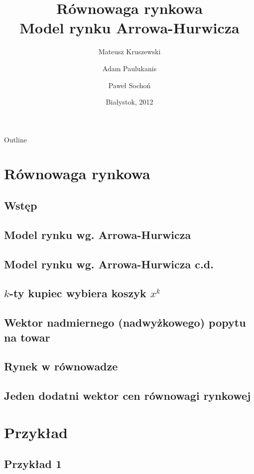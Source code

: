 \documentclass[a4paper,11pt]{beamer}
\title[Model rynku Arrowa-Hurwicza]
{
  Równowaga rynkowa\\
  Model rynku Arrowa-Hurwicza
}
\author[Kruszewski, Paulukanis, Sochoń]
{
  Mateusz Kruszewski  \and
  Adam Paulukanis     \and
  Paweł Sochoń
}
\institute[UwB]
{
  Uniwersytet w Białymstoku
}
\date[Białystok, 2012]
{
  Białystok, 2012
}
\begin{document}
  \begin{frame}
    \titlepage
  \end{frame}

  \begin{frame}{Outline}
    \tableofcontents
  \end{frame}


  \section{Równowaga rynkowa}
    \subsection{Wstęp}
    \subsection{Model rynku wg. Arrowa-Hurwicza}
    \subsection{Model rynku wg. Arrowa-Hurwicza c.d.}
    \subsection{$k$-ty kupiec wybiera koszyk $x^k$}
    \subsection{Wektor nadmiernego (nadwyżkowego) popytu na towar}
    \subsection{Rynek w równowadze}
    \subsection{Jeden dodatni wektor cen równowagi rynkowej}

  \section{Przykład}
    \subsection{Przykład 1}
\end{document}
